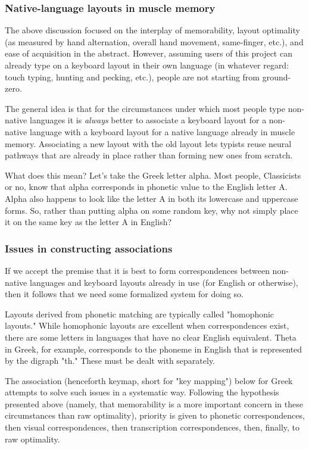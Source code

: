 \documentclass[11pt]{article}
\begin{document}
\subsubsection{Native-language layouts in muscle memory}
\label{sec:org6d295de}

The above discussion focused on the interplay of memorability, layout optimality (as measured by hand alternation, overall hand movement, same-finger, etc.), and ease of acquisition in the abstract. However, assuming users of this project can already type on a keyboard layout in their own language (in whatever regard: touch typing, hunting and pecking, etc.), people are not starting from ground-zero.

The general idea is that for the circumstances under which most people type non-native languages it is \emph{always} better to associate a keyboard layout for a non-native language with a keyboard layout for a native language already in muscle memory. Associating a new layout with the old layout lets typists reuse neural pathways that are already in place rather than forming new ones from scratch.

What does this mean? Let's take the Greek letter alpha. Most people, Classicists or no, know that alpha corresponds in phonetic value to the English letter A. Alpha also happens to look like the letter A in both its lowercase and uppercase forms. So, rather than putting alpha on some random key, why not simply place it on the same key as the letter A in English?

\subsubsection{Issues in constructing associations}
\label{sec:org6b723a5}

If we accept the premise that it is best to form correspondences between non-native languages and keyboard layouts already in use (for English or otherwise), then it follows that we need some formalized system for doing so.

Layouts derived from phonetic matching are typically called "homophonic layouts." While homophonic layouts are excellent when correspondences exist, there are some letters in languages that have no clear English equivalent. Theta in Greek, for example, corresponds to the phoneme in English that is represented by the digraph "th." These must be dealt with separately.

The association (henceforth keymap, short for "key mapping") below for Greek attempts to solve such issues in a systematic way. Following the hypothesis presented above (namely, that memorability is a more important concern in these circumstances than raw optimality), priority is given to phonetic correspondences, then visual correspondences, then transcription correspondences, then, finally, to raw optimality.
\end{document}

